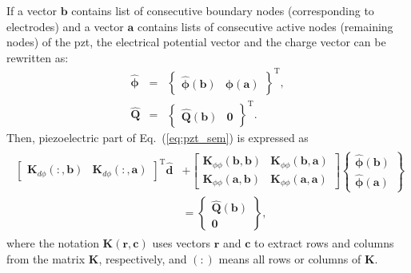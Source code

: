\documentclass[11pt,a4paper,final]{report}
\theoremstyle{plain}
\begin{document}
If a vector \(\textbf{b}\) contains list of consecutive boundary nodes (corresponding to electrodes) and a vector \(\textbf{a}\) contains lists of consecutive active nodes (remaining nodes) of the \ac{pzt}, the electrical potential vector and the charge vector can be rewritten as:
\begin{eqnarray}
	\widehat{\boldsymbol{\phi}} & = & \left \{\begin{array}{cc}
		\widehat{\boldsymbol{\phi}}(\textbf{b}) &
		\widehat{\boldsymbol{\phi}}(\textbf{a})
	\end{array}\right \}^{\mathrm{T}},\\
	\widehat{\textbf{Q}} & = & \left \{\begin{array}{cc}
		\widehat{\textbf{Q}}(\textbf{b}) & \textbf{0}
	\end{array}\right \}^{\mathrm{T}}.
	\label{eq:phi_Q}
\end{eqnarray}
Then, piezoelectric part of Eq.~(\ref{eq:pzt_sem}) is expressed as
\begin{eqnarray}
	\begin{split}
		\left [\begin{array}{cc}
			\textbf{K}_{d \phi}(:,\textbf{b}) &
			\textbf{K}_{d \phi}(:,\textbf{a})
		\end{array}\right]^{\mathrm{T}}
		\widehat{\textbf{d}} & +
		\left [\begin{array}{cc}
			\textbf{K}_{\phi \phi}(\textbf{b},\textbf{b}) & \textbf{K}_{\phi 		\phi}(\textbf{b},\textbf{a})\\
			\textbf{K}_{\phi \phi}(\textbf{a},\textbf{b}) & \textbf{K}_{\phi \phi}(\textbf{a},\textbf{a})
		\end{array}\right]
		\left \{\begin{array}{c}
			\widehat{\boldsymbol{\phi}}(\textbf{b}) \\
			\widehat{\boldsymbol{\phi}}(\textbf{a})
		\end{array}\right \}\\ 
		& = \left \{\begin{array}{c}
			\widehat{\textbf{Q}}(\textbf{b}) \\
			\textbf{0}
		\end{array}\right \},
	\end{split}
	\label{eq:pztboundary}
\end{eqnarray}
where the notation \(\textbf{K}(\textbf{r},\textbf{c})\) uses vectors \(\textbf{r}\) and \(\textbf{c}\) to extract rows and columns from the matrix \(\textbf{K}\), respectively, and \((:)\) means all rows or columns of \(\textbf{K}\).
\end{document}
